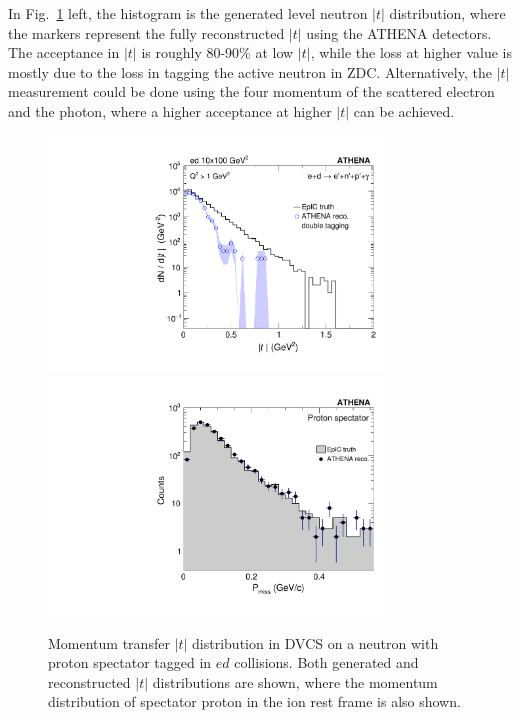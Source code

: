 \documentclass[%
superscriptaddress,
nofootinbib,
 amsmath,amssymb,
 aps,
showkeys
]{revtex4-2}
\begin{document}
In Fig.~\ref{fig:figure_1} left, the histogram is the generated level neutron $|t|$ distribution, where the markers represent the fully reconstructed $|t|$ using the ATHENA detectors. The acceptance in $|t|$ is roughly 80-90\% at low $|t|$, while the loss at higher value is mostly due to the loss in tagging the active neutron in ZDC. Alternatively, the $|t|$ measurement could be done using the four momentum of the scattered electron and the photon, where a higher acceptance at higher $|t|$ can be achieved. 


\begin{figure}[thb]
\centering
\includegraphics[width=3.5in]{Figure_1.pdf}
\includegraphics[width=3.5in]{Figure_2.pdf}
  \caption{ \label{fig:figure_1} Momentum transfer $|t|$ distribution in DVCS on a neutron with proton spectator tagged in $ed$ collisions. Both generated and reconstructed $|t|$ distributions are shown, where the momentum distribution of spectator proton in the ion rest frame is also shown. }
\end{figure}


\end{document}
